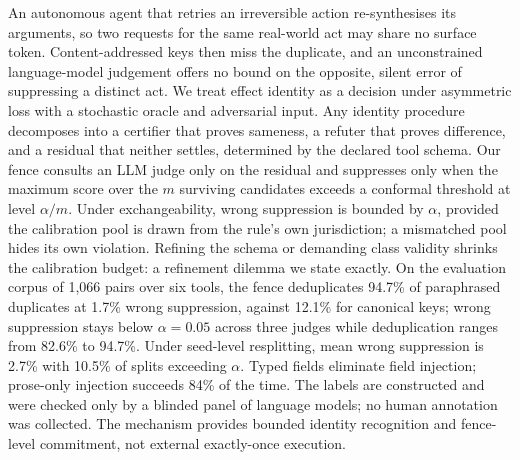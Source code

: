 An autonomous agent that retries an irreversible action re-synthesises its arguments, so two requests for the same real-world act may share no surface token. Content-addressed keys then miss the duplicate, and an unconstrained language-model judgement offers no bound on the opposite, silent error of suppressing a distinct act. We treat effect identity as a decision under asymmetric loss with a stochastic oracle and adversarial input. Any identity procedure decomposes into a certifier that proves sameness, a refuter that proves difference, and a residual that neither settles, determined by the declared tool schema. Our fence consults an LLM judge only on the residual and suppresses only when the maximum score over the $m$ surviving candidates exceeds a conformal threshold at level $\alpha/m$. Under exchangeability, wrong suppression is bounded by $\alpha$, provided the calibration pool is drawn from the rule's own jurisdiction; a mismatched pool hides its own violation. Refining the schema or demanding class validity shrinks the calibration budget: a refinement dilemma we state exactly. On the evaluation corpus of 1,066 pairs over six tools, the fence deduplicates 94.7\% of paraphrased duplicates at 1.7\% wrong suppression, against 12.1\% for canonical keys; wrong suppression stays below $\alpha=0.05$ across three judges while deduplication ranges from 82.6\% to 94.7\%. Under seed-level resplitting, mean wrong suppression is 2.7\% with 10.5\% of splits exceeding $\alpha$. Typed fields eliminate field injection; prose-only injection succeeds 84\% of the time. The labels are constructed and were checked only by a blinded panel of language models; no human annotation was collected. The mechanism provides bounded identity recognition and fence-level commitment, not external exactly-once execution.
